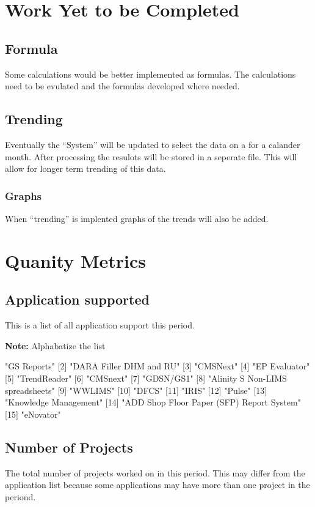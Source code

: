 \documentclass{article}
\begin{document}
\section{Work Yet to be Completed}
\subsection{Formula}
Some calculations would be better implemented as formulas. The calculations need
to be evulated and the formulas developed where needed.
\subsection{Trending}
Eventually the ``System'' will be updated to select the data on a for a calander
month. After processing the resulots will be stored in a seperate file.
This will allow for longer term trending of this data.
\subsubsection{Graphs}
When ``trending'' is implented graphs of the trends will also be added.


\section{Quanity Metrics}
\subsection{Application supported}
This is a list of all application support this period.

\textbf{Note:} Alphabatize the list

\begin{Schunk}
\begin{Soutput}
 [1] "GS Reports"
 [2] "DARA Filler DHM and RU"
 [3] "CMSNext"
 [4] "EP Evaluator"
 [5] "TrendReader"
 [6] "CMSnext"
 [7] "GDSN/GS1"
 [8] "Alinity S Non-LIMS spreadsheets"
 [9] "WWLIMS"
[10] "DFCS"
[11] "IRIS"
[12] "Pulse"
[13] "Knowledge Management"
[14] "ADD Shop Floor Paper (SFP) Report System"
[15] "eNovator"
\end{Soutput}
\end{Schunk}

\subsection{Number of Projects}
The total number of  projects worked on in this period. This may differ from the
application list because some applications may have more than one project in
the periond.
\end{document}
